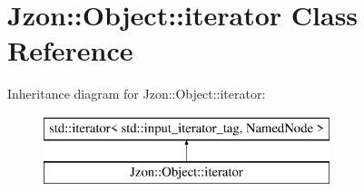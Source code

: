 \hypertarget{class_jzon_1_1_object_1_1iterator}{\section{Jzon\-:\-:Object\-:\-:iterator Class Reference}
\label{class_jzon_1_1_object_1_1iterator}
}
Inheritance diagram for Jzon\-:\-:Object\-:\-:iterator\-:\begin{figure}[H]
\begin{center}
\leavevmode
\includegraphics[height=2.000000cm]{class_jzon_1_1_object_1_1iterator}
\end{center}
\end{figure}
